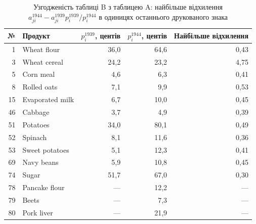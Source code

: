 \begin{table}[htbp]
\centering\small
\caption{Узгодженість таблиці B з таблицею A: найбільше відхилення $a^{1944}_{ji}-a^{1939}_{ji}p^{1939}_i/p^{1944}_i$ в одиницях останнього друкованого знака}
\label{tab:glpk-datacheck-1944}
\begin{tabular}{rlrrr}
\toprule
№ & Продукт & $p_i^{1939}$, центів & $p_i^{1944}$, центів & Найбільше відхилення \\
\midrule
1 & Wheat flour & 36{,}0 & 64{,}6 & 0{,}43 \\
3 & Wheat cereal & 24{,}2 & 23{,}2 & 4{,}75 \\
5 & Corn meal & 4{,}6 & 6{,}3 & 0{,}41 \\
8 & Rolled oats & 7{,}1 & 9{,}9 & 0{,}53 \\
15 & Evaporated milk & 6{,}7 & 10{,}0 & 0{,}45 \\
46 & Cabbage & 3{,}7 & 4{,}9 & 0{,}39 \\
51 & Potatoes & 34{,}0 & 80{,}1 & 0{,}49 \\
52 & Spinach & 8{,}1 & 11{,}6 & 0{,}36 \\
53 & Sweet potatoes & 5{,}1 & 12{,}3 & 0{,}41 \\
69 & Navy beans & 5{,}9 & 10{,}8 & 0{,}45 \\
74 & Sugar & 51{,}7 & 67{,}0 & 0{,}30 \\
78 & Pancake flour & --- & 12{,}2 & --- \\
79 & Beets & --- & 7{,}3 & --- \\
80 & Pork liver & --- & 21{,}9 & --- \\
\bottomrule
\end{tabular}
\end{table}
